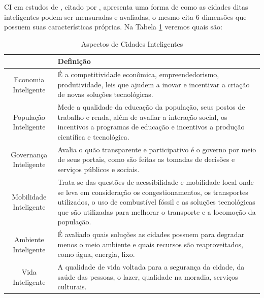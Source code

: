 CI em estudos de , citado  por , apresenta uma forma de como as cidades ditas inteligentes podem ser mensuradas e avaliadas, o mesmo cita 6 dimensões que possuem suas características próprias. Na Tabela \ref{tab:tabela1} veremos quais são:


\begin{table}[h]
\centering
\caption{Aspectos de Cidades Inteligentes}
\label{tab:tabela1}
\vspace{0.0cm}
\begin{tabular}{cp{10cm}}
\hline
 & Definição \\
\hline
\vspace{0.05cm}
Economia Inteligente & 
É a competitividade econômica, empreendedorismo, produtividade, leis que ajudem a inovar e incentivar a criação de novas soluções tecnológicas. \\
\hline
\vspace{0.05cm}
População Inteligente & 
Mede a qualidade da educação da população, seus postos de trabalho e renda, além de avaliar a interação social, os incentivos a programas de educação e incentivos a produção científica e tecnológica. \\
\hline
\vspace{0.05cm}
Governança Inteligente & Avalia o quão transparente e participativo é o governo por meio de seus portais, como são feitas as tomadas de decisões e serviços públicos e sociais.\\
\hline
\vspace{0.05cm}
Mobilidade Inteligente & Trata-se das questões de acessibilidade e mobilidade local onde se leva em consideração os congestionamentos, os transportes utilizados, o uso de combustível fóssil e as soluções tecnológicas que são utilizadas para melhorar o transporte e a locomoção da população.
 \\
\hline
\vspace{0.05cm}
Ambiente Inteligente &
É avaliado quais soluções as cidades possuem para degradar menos o meio ambiente e quais recursos são reaproveitados, como água, energia, lixo.
\\
\hline
Vida Inteligente &
A qualidade de vida voltada para a segurança da cidade, da saúde das pessoas, o lazer, qualidade na moradia, serviços culturais.

\end{tabular}
\end{table}


